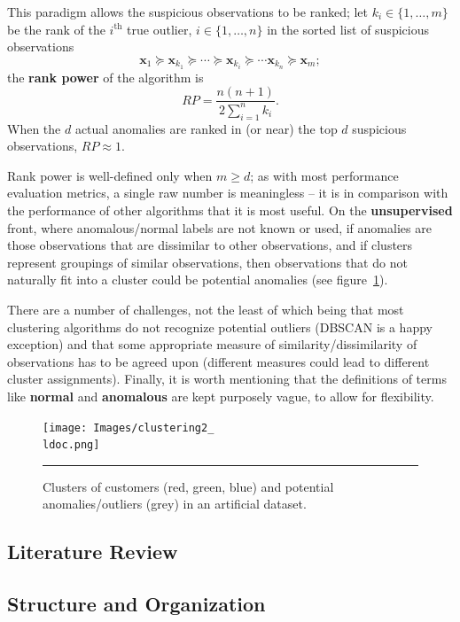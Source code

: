 \par This paradigm allows the suspicious ob\-ser\-va\-tions to be ranked; let $k_i\in\{1,\ldots,m\}$ be the rank of the $i^{\text{th}}$ true outlier, $i\in \{1,\ldots,n\}$ in the sorted list of suspicious ob\-ser\-va\-tions $$\mathbf{x}_1\succeq \mathbf{x}_{k_1}\succeq \cdots\succeq\mathbf{x}_{k_i}\succeq \cdots \mathbf{x}_{k_n}\succeq \mathbf{x}_m;$$ the \textbf{rank power} of the algorithm is $$RP=\frac{n(n+1)}{2\sum_{i=1}^nk_i}.$$ When the $d$ actual anomalies are ranked in (or near) the top $d$ suspicious ob\-ser\-va\-tions, $RP\approx 1$. \par Rank power is well-defined only when $m\geq d$; as with most performance evaluation metrics, a single raw number is meaningless -- it is in comparison with the performance of other algorithms that it is most useful.  \newl On the \textbf{unsupervised} front, where anomalous/normal labels are not known or used, if anomalies are those ob\-ser\-va\-tions that are dissimilar to other ob\-ser\-va\-tions, and if clusters represent groupings of similar ob\-ser\-va\-tions, then ob\-ser\-va\-tions that do not naturally fit into a cluster could be potential anomalies (see figure~\ref{fig:clust2}). \par There are a number of challenges, not the least of which being that most clustering algorithms do not recognize potential outliers (DBSCAN is a happy exception) and that some appropriate measure of similarity/dissimilarity of ob\-ser\-va\-tions has to be agreed upon (different measures could lead to different cluster assignments). \newl Finally, it is worth mentioning that the definitions of terms like \textbf{normal} and \textbf{anomalous} are kept purposely vague, to allow for flexibility. 
\begin{figure}[t]
\centering
\texttt{[image: Images/clustering2\_\\ldoc.png]}
\caption{\small Clusters of customers (red, green, blue) and potential anomalies/outliers (grey) in an artificial dataset.}\hrule\label{fig:clust2}
\end{figure}

\subsection{Literature Review}
\newpage
\subsection{Structure and Organization}
\newpage